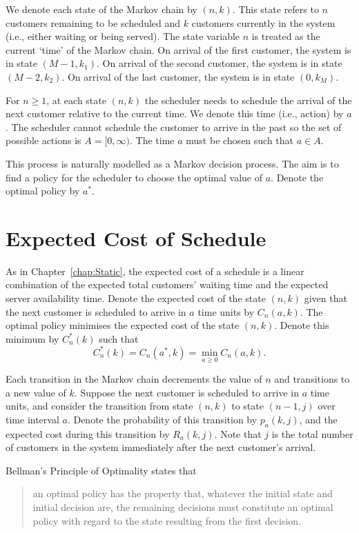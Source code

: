 We denote each state of the Markov chain by $(n, k)$. This state refers to $n$ customers remaining to be scheduled and $k$ customers currently in the system (i.e., either waiting or being served). The state variable $n$ is treated as the current `time' of the Markov chain. On arrival of the first customer, the system is in state $(M - 1, k_{1})$. On arrival of the second customer, the system is in state $(M - 2, k_{2})$. On arrival of the last customer, the system is in state $(0, k_{M})$.

For $n \geq 1$, at each state $(n, k)$ the scheduler needs to schedule the arrival of the next customer relative to the current time. We denote this time (i.e., action) by $a$. The scheduler cannot schedule the customer to arrive in the past so the set of possible actions is $A = [0, \infty)$. The time $a$ must be chosen such that $a \in A$.

This process is naturally modelled as a Markov decision process. The aim is to find a policy for the scheduler to choose the optimal value of $a$. Denote the optimal policy by $a^{*}$.

\section{Expected Cost of Schedule}
As in Chapter~\ref{chap:Static}, the expected cost of a schedule is a linear combination of the expected total customers' waiting time and the expected server availability time. Denote the expected cost of the state $(n, k)$ given that the next customer is scheduled to arrive in $a$ time units by $C_{n} (a, k)$. The optimal policy minimises the expected cost of the state $(n, k)$. Denote this minimum by $C_{n}^{*} (k)$ such that
\begin{equation}
	C_{n}^{*} (k) = C_{n} (a^{*}, k) = \min_{a \geq 0} C_{n} (a, k).
\end{equation}

Each transition in the Markov chain decrements the value of $n$ and transitions to a new value of $k$. Suppose the next customer is scheduled to arrive in $a$ time units, and consider the transition from state $(n, k)$ to state $(n - 1, j)$ over time interval $a$. Denote the probability of this transition by $p_{a} (k, j)$, and the expected cost during this transition by $R_{a} (k, j)$. Note that $j$ is the total number of customers in the system immediately after the next customer's arrival.

Bellman's Principle of Optimality \citep{Sniedovich} states that
\begin{quote}
	an optimal policy has the property that, whatever the initial state and initial decision are, the remaining decisions must constitute an optimal policy with regard to the state resulting from the first decision.
\end{quote}

